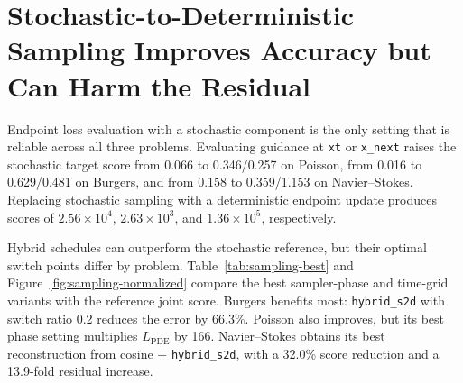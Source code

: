 \documentclass[twoside,11pt]{article}
\newcommand{\Lpde}{L_{\mathrm{PDE}}}
\newcommand{\hsd}{\texttt{hybrid\_s2d}}
\begin{document}
\section{Stochastic-to-Deterministic Sampling Improves Accuracy but Can Harm the Residual}
\label{sec:sampling}

Endpoint loss evaluation with a stochastic component is the only setting
that is reliable across all three problems.  Evaluating guidance at
\texttt{xt} or \texttt{x\_next} raises the stochastic target score from
0.066 to 0.346/0.257 on Poisson, from 0.016 to 0.629/0.481 on Burgers, and
from 0.158 to 0.359/1.153 on Navier--Stokes.  Replacing stochastic sampling
with a deterministic endpoint update produces scores of
\(2.56\times10^4\), \(2.63\times10^3\), and \(1.36\times10^5\),
respectively.

Hybrid schedules can outperform the stochastic reference, but their optimal
switch points differ by problem.  Table~\ref{tab:sampling-best} and
Figure~\ref{fig:sampling-normalized} compare the best sampler-phase and
time-grid variants with the reference joint score.  Burgers benefits most:
\hsd{} with switch ratio 0.2 reduces the error by 66.3\%.  Poisson also
improves, but its best phase setting multiplies \(\Lpde\) by 166.
Navier--Stokes obtains its best reconstruction from cosine + \hsd{}, with a
32.0\% score reduction and a 13.9-fold residual increase.
\end{document}

